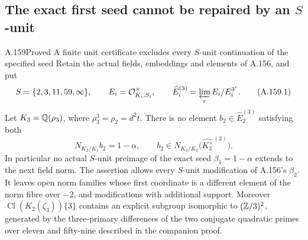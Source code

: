 \subsection{The exact first seed cannot be repaired by an $S$-unit}

\begin{statement}{A.159}{Proved}
{A finite unit certificate excludes every $S$-unit continuation of the specified seed}
Retain the actual fields, embeddings and elements of A.156, and put
\[
 S=\{2,3,11,59,\infty\},\qquad
 E_i=\mathcal O_{K_i,S_i}^{\times},\qquad
 \widehat E_i^{(3)}=\varprojlim_r E_i/E_i^{3^r}.
\tag{A.159.1}
\]
Let \(K_3=\mathbb Q(\rho_3)\), where \(\rho_3^3=\rho_2=d^2t\).
There is no element \(b_2\in\widehat E_2^{(3)}\) satisfying both
\[
 N_{K_2/K_1}b_2=1-\alpha,
 \qquad
 b_2\in N_{K_3/K_2}\bigl(\widehat{K_3^{\times}}^{(3)}\bigr).
\tag{A.159.2}
\]
In particular no actual $S$-unit preimage of the exact seed
\(\beta_1=1-\alpha\) extends to the next field norm.
The assertion allows every $S$-unit modification of A.156's \(\beta_2\).
It leaves open norm families whose first coordinate is a different element
of the norm fibre over \(-2\), and modifications with additional support.
Moreover \(\operatorname{Cl}(K_2(\zeta_3))\{3\}\) contains an
explicit subgroup isomorphic to \((\mathbb Z/3)^2\), generated by the
three-primary differences of the two conjugate quadratic primes over
eleven and fifty-nine described in the companion proof.
\end{statement}

